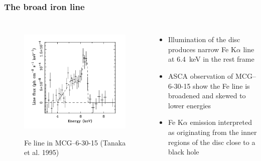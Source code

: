 \documentclass[]{beamer}
\begin{document}
\begin{frame}
\frametitle{The broad iron line}
\begin{columns}
{
    \begin{figure}
    \includegraphics[width=\textwidth,height=.5\textheight]{broadKline.png}\\
    \caption{Fe line in MCG--6-30-15 (Tanaka et al. 1995)}
    \end{figure}
}
\begin{itemize}
    \item Illumination of the disc produces narrow Fe K$\alpha$ line at 6.4~keV in the rest frame
    \item ASCA observation of MCG--6-30-15 show the Fe line is broadened and skewed to lower energies
    \item Fe K$\alpha$ emission interpreted as originating from the inner regions of the disc close to a black hole
\end{itemize}
\end{columns}
\end{frame}
\end{document}
